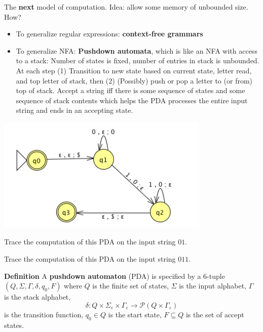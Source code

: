 The {\bf next} model of computation. Idea: allow some memory of unbounded size. How? 
\begin{itemize}
    \item To generalize regular expressions: {\bf context-free grammars}\\
    \item To generalize NFA: {\bf Pushdown automata}, which is like an NFA with access to a stack: 
    Number of states is fixed, number of entries in stack is unbounded. At each step
    (1) Transition to new state based on current state, letter read, and top letter of stack, then
    (2) (Possibly) push or pop a letter to (or from) top of stack. Accept a string iff
    there is some sequence of states and some sequence of stack contents 
    which helps the PDA processes the entire input string and ends in an accepting state.
\end{itemize}

\includegraphics[width=4in]{../../resources/machines/Lect9PDA.png}
    
Trace the computation of this PDA on the input string $01$.

\vspace{80pt}  
    
Trace the computation of this PDA on the input string $011$.

\vspace{80pt}
    
    
\newpage
    
{\bf Definition} A {\bf pushdown automaton} (PDA) is  specified by a  $6$-tuple $(Q, \Sigma, \Gamma, \delta, q_0, F)$
where $Q$ is the finite set of states, $\Sigma$ is the input alphabet,  $\Gamma$ is the stack alphabet,
\[
    \delta: Q \times \Sigma_\varepsilon  \times  \Gamma_\varepsilon \to \mathcal{P}( Q \times \Gamma_\varepsilon)
\]
is the transition function,  $q_0 \in Q$ is the start state, $F \subseteq  Q$ is the set of accept states.
    
